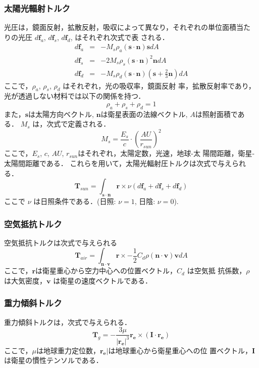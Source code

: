 \subsubsection{太陽光輻射トルク}
光圧は，鏡面反射，拡散反射，吸収によって異なり，それぞれの単位面積当た
りの光圧 $d \bm{f}_a$, $d \bm{f}_s$, $d \bm{f}_d$, はそれぞれ次式で表
される．
\begin{eqnarray}
  d \bm{f}_a &=& -M_s\rho_a(\bm{s} \cdot \bm{n})\bm{s}dA  \\
  d \bm{f}_s &=& -2M_s\rho_s (\bm{s} \cdot \bm{n})^2
  \bm{n}dA \\
  d \bm{f}_d &=& -M_s\rho_d (\bm{s} \cdot \bm{n}) \left(\bm{s} +
  \frac{2}{3}\bm{n} \right) dA
\end{eqnarray}
ここで，$\rho_a$, $\rho_s$, $\rho_d$ はそれぞれ，光の吸収率，鏡面反射
率，拡散反射率であり，光が透過しない材料では以下の関係を持つ．
\begin{equation}
  \rho_a + \rho_s + \rho_d = 1
\end{equation}
また，$\bm{s}$は太陽方向ベクトル, $\bm{n}$は衛星表面の法線ベクトル,
$A$は照射面積である．
$M_s$ は，次式で定義される．
\begin{equation}
  M_s = \frac{E_s}{c} \cdot \left( \frac{AU}{r_{sun}} \right)^2
\end{equation}
ここで，$E_s$, $c$, $AU$, $r_{sun}$はそれぞれ，太陽定数，光速，地球-太
陽間距離，衛星-太陽間距離である．
これらを用いて，太陽光輻射圧トルクは次式で与えられる．
\begin{equation}
  \bm{T}_{sun} = \int_{\bm{s}\cdot\bm{n}} \bm{r} \times \nu(d\bm{f}_a +
  d\bm{f}_s + d\bm{f}_d)
\end{equation}
ここで $\nu$ は日照条件である．(日照: $\nu=1$, 日陰: $\nu=0$).


\subsubsection{空気抵抗トルク}
空気抵抗トルクは次式で与えられる
\begin{equation}
  \bm{T}_{air} = \int_{\bm{n}\cdot\bm{v}} \bm{r} \times
  -\frac{1}{2}C_d\rho (\bm{n}\cdot\bm{v})\bm{v} dA
\end{equation}
ここで，$\bm{r}$は衛星重心から空力中心への位置ベクトル，$C_d$ は空気抵
抗係数，$\rho$ は大気密度，$\bm{v}$ は衛星の速度ベクトルである．

\subsubsection{重力傾斜トルク}
重力傾斜トルクは，次式で与えられる．
\begin{equation}
  \bm{T}_g = -\frac{3\mu}{|\bm{r_e}|^3}\bm{r_e} \times (\bm{I} \cdot
  \bm{r_e})
\end{equation}
ここで，$\mu$は地球重力定位数，$\bm{r_e}|$は地球重心から衛星重心への位
置ベクトル，$\bm{I}$は衛星の慣性テンソルである．

